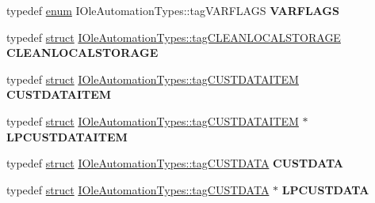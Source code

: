 \begin{DoxyCompactItemize}
\item 
\mbox{\label{interface_i_ole_automation_types_a19d4e5bcdb05fca65d43957c873c697a}} 
typedef \hyperlink{interfaceenum}{enum} I\+Ole\+Automation\+Types\+::tag\+V\+A\+R\+F\+L\+A\+GS {\bfseries V\+A\+R\+F\+L\+A\+GS}
\item 
\mbox{\label{interface_i_ole_automation_types_abab0a8565bd3025c54b4a31bc76d477a}} 
typedef \hyperlink{interfacestruct}{struct} \hyperlink{struct_i_ole_automation_types_1_1tag_c_l_e_a_n_l_o_c_a_l_s_t_o_r_a_g_e}{I\+Ole\+Automation\+Types\+::tag\+C\+L\+E\+A\+N\+L\+O\+C\+A\+L\+S\+T\+O\+R\+A\+GE} {\bfseries C\+L\+E\+A\+N\+L\+O\+C\+A\+L\+S\+T\+O\+R\+A\+GE}
\item 
\mbox{\label{interface_i_ole_automation_types_ab2a1534466d80a4ac4ea7807a33a1fff}} 
typedef \hyperlink{interfacestruct}{struct} \hyperlink{struct_i_ole_automation_types_1_1tag_c_u_s_t_d_a_t_a_i_t_e_m}{I\+Ole\+Automation\+Types\+::tag\+C\+U\+S\+T\+D\+A\+T\+A\+I\+T\+EM} {\bfseries C\+U\+S\+T\+D\+A\+T\+A\+I\+T\+EM}
\item 
\mbox{\label{interface_i_ole_automation_types_a5de7066666dd212511c3156104769b1c}} 
typedef \hyperlink{interfacestruct}{struct} \hyperlink{struct_i_ole_automation_types_1_1tag_c_u_s_t_d_a_t_a_i_t_e_m}{I\+Ole\+Automation\+Types\+::tag\+C\+U\+S\+T\+D\+A\+T\+A\+I\+T\+EM} $\ast$ {\bfseries L\+P\+C\+U\+S\+T\+D\+A\+T\+A\+I\+T\+EM}
\item 
\mbox{\label{interface_i_ole_automation_types_a6ec562ee499fd02018640f702df1619e}} 
typedef \hyperlink{interfacestruct}{struct} \hyperlink{struct_i_ole_automation_types_1_1tag_c_u_s_t_d_a_t_a}{I\+Ole\+Automation\+Types\+::tag\+C\+U\+S\+T\+D\+A\+TA} {\bfseries C\+U\+S\+T\+D\+A\+TA}
\item 
\mbox{\label{interface_i_ole_automation_types_a8faa2384fd524551b10280dc2f801aee}} 
typedef \hyperlink{interfacestruct}{struct} \hyperlink{struct_i_ole_automation_types_1_1tag_c_u_s_t_d_a_t_a}{I\+Ole\+Automation\+Types\+::tag\+C\+U\+S\+T\+D\+A\+TA} $\ast$ {\bfseries L\+P\+C\+U\+S\+T\+D\+A\+TA}
\end{DoxyCompactItemize}
